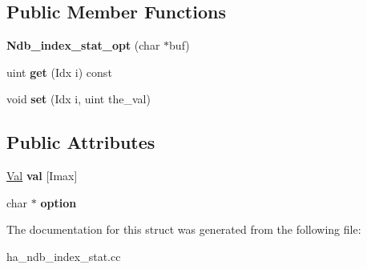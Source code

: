 \subsection*{Public Member Functions}
\begin{DoxyCompactItemize}
\item 
\mbox{\label{structNdb__index__stat__opt_a4be7697b97a5e00179bd999ee544efd2}} 
{\bfseries Ndb\+\_\+index\+\_\+stat\+\_\+opt} (char $\ast$buf)
\item 
\mbox{\label{structNdb__index__stat__opt_a39d47942af95b2959e0f4565da2f0130}} 
uint {\bfseries get} (Idx i) const
\item 
\mbox{\label{structNdb__index__stat__opt_afa540120fc5676822a0d1972d682e944}} 
void {\bfseries set} (Idx i, uint the\+\_\+val)
\end{DoxyCompactItemize}
\subsection*{Public Attributes}
\begin{DoxyCompactItemize}
\item 
\mbox{\label{structNdb__index__stat__opt_a5c16a20d3ae6fae6a81bff4af48b8484}} 
\mbox{\hyperlink{structNdb__index__stat__opt_1_1Val}{Val}} {\bfseries val} \mbox{[}Imax\mbox{]}
\item 
\mbox{\label{structNdb__index__stat__opt_a29430b30269a85bee9f6994d9fd035fd}} 
char $\ast$ {\bfseries option}
\end{DoxyCompactItemize}


The documentation for this struct was generated from the following file\+:\begin{DoxyCompactItemize}
\item 
ha\+\_\+ndb\+\_\+index\+\_\+stat.\+cc\end{DoxyCompactItemize}
